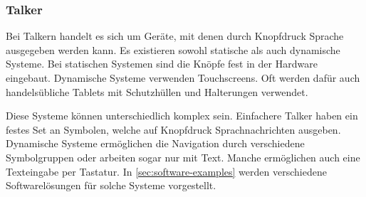 		\subsubsection*{Talker}
        	Bei Talkern handelt es sich um Geräte, mit denen durch Knopfdruck Sprache ausgegeben werden kann. Es existieren sowohl statische als auch dynamische Systeme. Bei statischen Systemen sind die Knöpfe fest in der Hardware eingebaut. Dynamische Systeme verwenden Touchscreens. Oft werden dafür auch handelsübliche Tablets mit Schutzhüllen und Halterungen verwendet. 
            
            Diese Systeme können unterschiedlich komplex sein. Einfachere Talker haben ein festes Set an Symbolen, welche auf Knopfdruck Sprachnachrichten ausgeben. Dynamische Systeme ermöglichen die Navigation durch verschiedene Symbolgruppen oder arbeiten sogar nur mit Text. Manche ermöglichen auch eine Texteingabe per Tastatur. In \autoref{sec:software-examples} werden verschiedene Softwarelösungen für solche Systeme vorgestellt.
            
